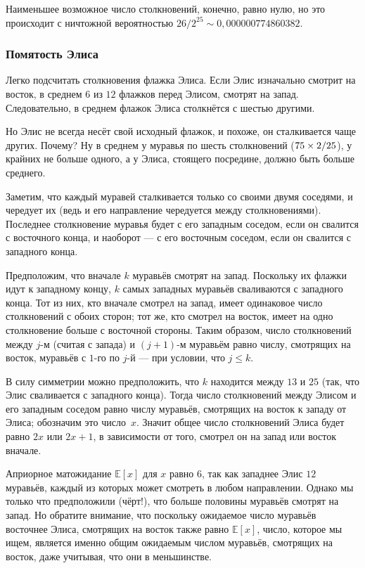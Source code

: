 Наименьшее возможное число столкновений, конечно, равно нулю, но это происходит с ничтожной вероятностью $26/2^{25} \sim 0{,}000000774860382$.


\subsubsection*{Помятость Элиса}

Легко подсчитать столкновения флажка Элиса.
Если Элис изначально смотрит на восток, в среднем $6$ из $12$ флажков перед Элисом, смотрят на запад.
Следовательно, в среднем  флажок Элиса столкнётся с шестью другими.

Но Элис не всегда несёт свой исходный флажок, и похоже, он сталкивается чаще других.
Почему?
Ну в среднем у муравья по шесть столкновений ($75 \z\times 2/25$), у крайних не больше одного, а у Элиса, стоящего посредине, должно быть больше среднего.

Заметим, что каждый муравей сталкивается только со своими двумя соседями,
и чередует их (ведь и его направление чередуется между столкновениями).
Последнее столкновение муравья будет с его западным соседом, если он свалится с восточного конца, и наоборот --- с его восточным соседом, если он свалится с западного конца.

Предположим, что вначале $k$ муравьёв смотрят на запад.
Поскольку их флажки идут к западному концу, $k$ самых западных муравьёв сваливаются с западного конца.
Тот из них, кто вначале смотрел на запад, имеет одинаковое число столкновений с обоих сторон;
тот же, кто смотрел на восток, имеет на одно столкновение больше с восточной стороны.
Таким образом, число столкновений между $j$-м  (считая с запада) и 
$(j+1)$-м муравьём равно числу, смотрящих на восток, муравьёв с $1$-го по $j$-й --- при условии, что $j\le k$.

В силу симметрии можно предположить, что $k$ находится между $13$ и $25$ (так, что Элис сваливается с западного конца).
Тогда число столкновений между Элисом и его западным соседом равно числу муравьёв, смотрящих на восток к западу от Элиса; обозначим это число~$x$.
Значит общее число столкновений Элиса будет равно $2x$ или $2x+1$, в зависимости от того, смотрел он на запад или восток вначале.

Априорное матожидание $\mathbb{E}[x]$ для $x$ равно $6$, так как западнее Элис $12$ муравьёв, каждый из которых может смотреть в любом направлении.
Однако мы только что предположили (чёрт!), что больше половины муравьёв смотрят на запад.
Но обратите внимание, что поскольку ожидаемое число муравьёв восточнее Элиса, смотрящих на восток также равно $\mathbb{E}[x]$, число, которое мы ищем, является именно общим ожидаемым числом муравьёв, смотрящих на восток, даже учитывая, что они в меньшинстве.

